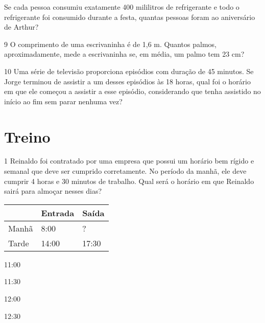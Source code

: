 {\begin{escolha}

\item
  Se cada pessoa consumiu exatamente 400 mililitros de refrigerante e
  todo o refrigerante foi consumido durante a festa, quantas pessoas
  foram ao aniversário de Arthur?

\end{escolha}


\num{9} O comprimento de uma escrivaninha é de 1,6 m. Quantos palmos,
aproximadamente, mede a escrivaninha se, em média, um palmo tem 23 cm?


\num{10} Uma série de televisão proporciona episódios com duração de 45
minutos. Se Jorge terminou de assistir a um desses episódios às 18 horas, qual
foi o horário em que ele começou a assistir a esse episódio, considerando que tenha assistido
no início ao fim sem parar nenhuma vez?



\section{Treino}

\num{1} Reinaldo foi contratado por uma empresa que possui um horário bem
rígido e semanal que deve ser cumprido corretamente. No período da manhã,
ele deve cumprir 4 horas e 30 minutos de trabalho. Qual será o horário em que
Reinaldo sairá para almoçar nesses dias?

\begin{longtable}[]{@{}lll@{}}
\toprule
& Entrada & Saída\tabularnewline
\midrule
\endhead
Manhã & 8:00 & ?\tabularnewline
Tarde & 14:00 & 17:30\tabularnewline
\bottomrule
\end{longtable}

\begin{escolha}
\item
  11:00
\item
  11:30
\item
  12:00
\item
  12:30
\end{escolha}

}
